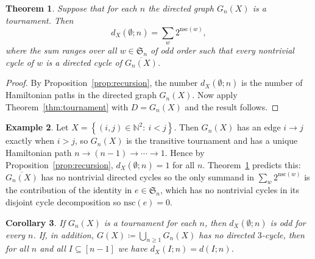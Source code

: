 \documentclass[12pt]{amsart}
\newtheorem{theorem}{Theorem}[section]
\newtheorem{corollary}[theorem]{Corollary}
\theoremstyle{definition}
\newtheorem{example}[theorem]{Example}
\theoremstyle{remark}
\newcommand{\N}{\mathbb{N}}
\newcommand{\Sset}{\mathfrak{S}}
\newcommand{\set}[1]{\left\{#1\right\}}
\begin{document}
\begin{theorem}\label{thm:hampath}
Suppose that for each $n$ the directed graph $G_n(X)$ is a tournament.
Then
\[
d_X(\emptyset;n)
=
\sum_{w} 2^{\mathrm{nsc}(w)},
\]
where the sum ranges over all $w\in\Sset_n$ of odd order such that every nontrivial cycle of $w$ is a directed cycle of
$\overline{G_n(X)}$.
\end{theorem}

\begin{proof}
By Proposition~\ref{prop:recursion}, the number \(d_X(\emptyset;n)\) is the number of Hamiltonian paths
in the directed graph \(G_n(X)\).  Now apply Theorem~\ref{thm:tournament} with $D=G_n(X)$ and the result follows.
\end{proof}



\begin{example}
Let $X=\set{(i,j)\in\N^2:\ i<j}$. Then $G_n(X)$ has an edge $i\to j$ exactly when $i>j$, so $G_n(X)$ is the transitive
tournament and has a unique Hamiltonian path $n\to(n-1)\to\cdots\to 1$. Hence by Proposition~\ref{prop:recursion}, $d_X(\emptyset;n)=1$ for all $n$. Theorem~\ref{thm:hampath} predicts this: $\overline{G_n(X)}$ has no nontrivial directed cycles so the only summand in $ \sum_w 2^{\text{nsc}(w)}$ is the contribution of the identity in $e \in \mathfrak{S}_n$, which has no nontrivial cycles in its disjoint cycle decomposition so $\text{nsc}(e)=0$.
\end{example}

\begin{corollary}\label{cor:tournamentpoly}
If $G_n(X)$ is a tournament for each $n$, then $d_X(\emptyset;n)$ is odd for every $n$.
If, in addition, $G(X)\coloneqq\bigcup_{n\ge 1}G_n(X)$ has no directed $3$-cycle, then for all $n$ and all
$I\subseteq[n-1]$ we have $d_X(I;n)=d(I;n)$.
\end{corollary}
\end{document}
